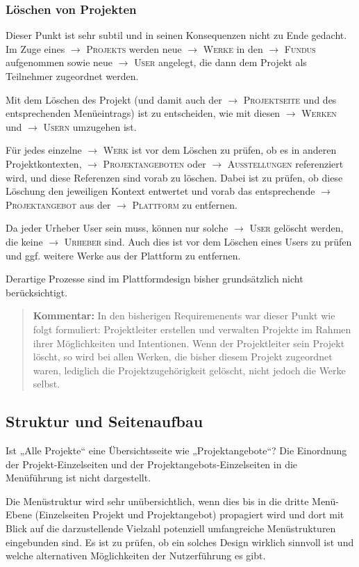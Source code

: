 \documentclass[a4paper,11pt]{article}
\newcommand{\Kommentar}[1]{
  \begin{quote}\textbf{Kommentar:} #1 \end{quote}
}
\newcommand{\glossar}[1]{{$\to$ \textsc{#1}}}
\begin{document}
\subsubsection*{Löschen von Projekten}

Dieser Punkt ist sehr subtil und in seinen Konsequenzen nicht zu Ende gedacht.
Im Zuge eines \glossar{Projekts} werden neue \glossar{Werke} in den
\glossar{Fundus} aufgenommen sowie neue \glossar{User} angelegt, die dann dem
Projekt als Teilnehmer zugeordnet werden.

Mit dem Löschen des Projekt (und damit auch der \glossar{Projektseite} und des
entsprechenden Menüeintrags) ist zu entscheiden, wie mit diesen
\glossar{Werken} und \glossar{Usern} umzugehen ist.

Für jedes einzelne \glossar{Werk} ist vor dem Löschen zu prüfen, ob es in
anderen Projektkontexten, \glossar{Projektangeboten} oder
\glossar{Ausstellungen} referenziert wird, und diese Referenzen sind vorab zu
löschen.  Dabei ist zu prüfen, ob diese Löschung den jeweiligen Kontext
entwertet und vorab das entsprechende \glossar{Projektangebot} aus der
\glossar{Plattform} zu entfernen.

Da jeder Urheber User sein muss, können nur solche \glossar{User} gelöscht
werden, die keine \glossar{Urheber} sind. Auch dies ist vor dem Löschen eines
Users zu prüfen und ggf. weitere Werke aus der Plattform zu entfernen.

Derartige Prozesse sind im Plattformdesign bisher grundsätzlich nicht
berücksichtigt.

\Kommentar{In den bisherigen Requiremenents war dieser Punkt wie folgt
  formuliert: Projektleiter erstellen und verwalten Projekte im Rahmen ihrer
  Möglichkeiten und Intentionen. Wenn der Projektleiter sein Projekt löscht, so
  wird bei allen Werken, die bisher diesem Projekt zugeordnet waren, lediglich
  die Projektzugehörigkeit gelöscht, nicht jedoch die Werke selbst.}

\subsection{Struktur und Seitenaufbau}

Ist „Alle Projekte“ eine Übersichtsseite wie „Projektangebote“?  Die Einordnung
der Projekt-Einzelseiten und der Projektangebots-Einzelseiten in die
Menüführung ist nicht dargestellt.

Die Menüstruktur wird sehr unübersichtlich, wenn dies bis in die dritte
Menü-Ebene (Einzelseiten Projekt und Projektangebot) propagiert wird und dort
mit Blick auf die darzustellende Vielzahl potenziell umfangreiche
Menüstrukturen eingebunden sind. Es ist zu prüfen, ob ein solches Design
wirklich sinnvoll ist und welche alternativen Möglichkeiten der Nutzerführung
es gibt. 
\end{document}
